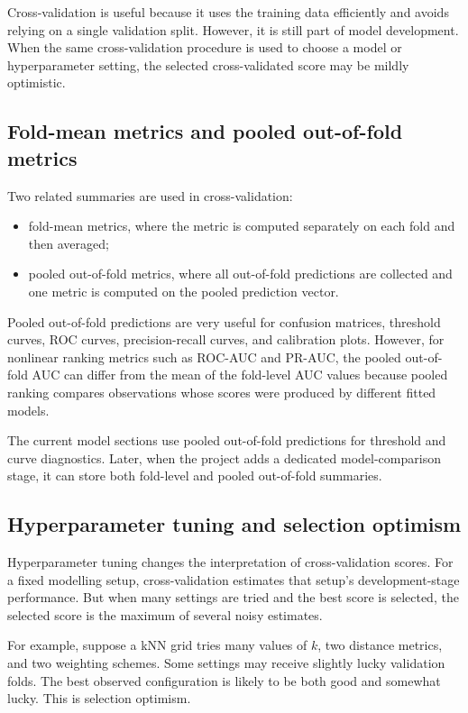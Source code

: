 Cross-validation is useful because it uses the training data efficiently and avoids relying on a single validation split. However, it is still part of model development. When the same cross-validation procedure is used to choose a model or hyperparameter setting, the selected cross-validated score may be mildly optimistic.

\subsection{Fold-mean metrics and pooled out-of-fold metrics}

Two related summaries are used in cross-validation:
\begin{itemize}
    \item fold-mean metrics, where the metric is computed separately on each fold and then averaged;
    \item pooled out-of-fold metrics, where all out-of-fold predictions are collected and one metric is computed on the pooled prediction vector.
\end{itemize}

Pooled out-of-fold predictions are very useful for confusion matrices, threshold curves, ROC curves, precision-recall curves, and calibration plots. However, for nonlinear ranking metrics such as ROC-AUC and PR-AUC, the pooled out-of-fold AUC can differ from the mean of the fold-level AUC values because pooled ranking compares observations whose scores were produced by different fitted models.

The current model sections use pooled out-of-fold predictions for threshold and curve diagnostics. Later, when the project adds a dedicated model-comparison stage, it can store both fold-level and pooled out-of-fold summaries.

\subsection{Hyperparameter tuning and selection optimism}

Hyperparameter tuning changes the interpretation of cross-validation scores. For a fixed modelling setup, cross-validation estimates that setup's development-stage performance. But when many settings are tried and the best score is selected, the selected score is the maximum of several noisy estimates.

For example, suppose a kNN grid tries many values of \(k\), two distance metrics, and two weighting schemes. Some settings may receive slightly lucky validation folds. The best observed configuration is likely to be both good and somewhat lucky. This is selection optimism.

